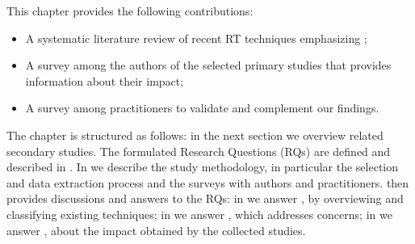 This chapter provides the following contributions:
\begin{itemize}
	\item A systematic literature review of recent RT techniques  emphasizing \rea;
	\item A survey among the authors of the selected primary studies that provides information about their impact;
	\item A survey among practitioners to validate and complement our findings.
\end{itemize}

The chapter is structured as follows: 
in the next section we overview related secondary studies.
The formulated Research Questions (RQs) are defined and described in .
In  we describe the study methodology, in particular the selection and data extraction process and the surveys with authors and practitioners.
 then provides discussions and answers to the RQs: 
in  we answer , by overviewing and classifying existing techniques;
in  we answer , which addresses \rea concerns; 
in  we answer , about the impact obtained by the collected studies.
